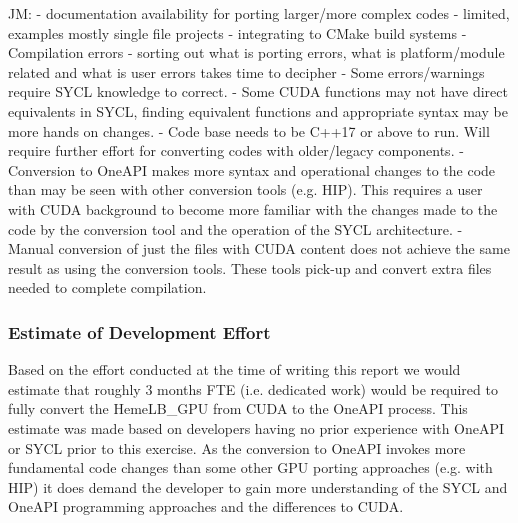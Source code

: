 \documentclass[../main]{subfiles}
\begin{document}
JM:
- documentation availability for porting larger/more complex codes - limited, examples mostly single file projects
- integrating to CMake build systems
- Compilation errors - sorting out what is porting errors, what is platform/module related and what is user errors takes time to decipher
- Some errors/warnings require SYCL knowledge to correct. 
- Some CUDA functions may not have direct equivalents in SYCL, finding equivalent functions and appropriate syntax may be more hands on changes.
- Code base needs to be C++17 or above to run. Will require further effort for converting codes with older/legacy components.
- Conversion to OneAPI makes more syntax and operational changes to the code than may be seen with other conversion tools (e.g. HIP). This requires a user with CUDA background to become more familiar with the changes made to the code by the conversion tool and the operation of the SYCL architecture.
- Manual conversion of just the files with CUDA content does not achieve the same result as using the conversion tools. These tools pick-up and convert extra files needed to complete compilation. 



\subsubsection{Estimate of Development Effort}
Based on the effort conducted at the time of writing this report we would estimate that roughly 3 months FTE (i.e. dedicated work) would be required to fully convert the HemeLB\_GPU from CUDA to the OneAPI process. This estimate was made based on developers having no prior experience with OneAPI or SYCL prior to this exercise. As the conversion to OneAPI invokes more fundamental code changes than some other GPU porting approaches (e.g. with HIP) it does demand the developer to gain more understanding of the SYCL and OneAPI programming approaches and the differences to CUDA.
\end{document}
